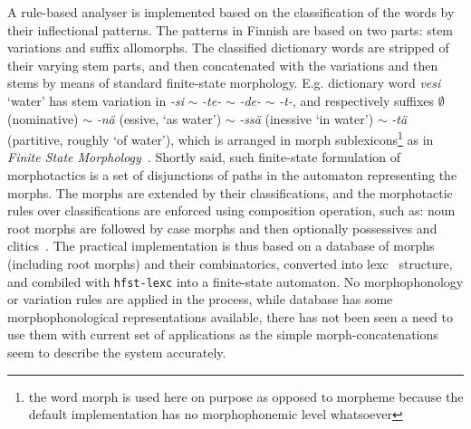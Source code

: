 \documentclass[a4paper,12pt]{article}
\begin{document}
A rule-based analyser is implemented based on the classification of the words
by their inflectional patterns. The patterns in Finnish are based on two parts:
stem variations and suffix allomorphs. The classified dictionary words are
stripped of their varying stem parts, and then concatenated with the variations
and then stems by means of standard finite-state morphology. E.g. dictionary
word \emph{vesi} `water' has stem variation in \emph{-si} $\sim$ \emph{-te-}
$\sim$ \emph{-de-} $\sim$ \emph{-t-}, and respectively suffixes $\emptyset$
(nominative) $\sim$ \emph{-nä} (essive, `as water') $\sim$ \emph{-ssä}
(inessive `in water')  $\sim$ \emph{-tä} (partitive, roughly `of water'), which
is arranged in morph sublexicons\footnote{the word morph is used here on purpose
    as opposed to morpheme because the default implementation has no
morphophonemic level whatsoever} as in \emph{Finite State
Morphology}~\citep{beesley2003finite}. Shortly said, such finite-state
formulation of morphotactics is a set of disjunctions of paths in the automaton
representing the morphs. The morphs are extended by their classifications, and
the morphotactic rules over classifications are enforced using composition
operation, such as: noun root morphs are followed by case morphs and then
optionally possessives and clitics~\citep{hfst2012}. The practical
implementation is thus based on a database of morphs (including root morphs)
and their combinatorics, converted into lexc~\citep{beesley2003finite}
structure, and combiled with \texttt{hfst-lexc} into a finite-state automaton.
No morphophonology or variation rules are applied in the process, while
database has some morphophonological representations available, there has not
been seen a need to use them with current set of applications as the simple
morph-concatenations seem to describe the system accurately.
\end{document}
